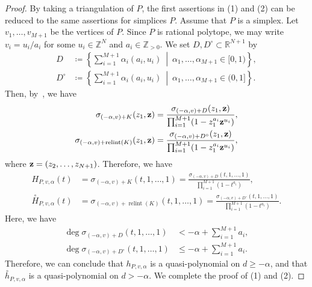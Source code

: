 \documentclass[ALCO,published]{cedram}
\theoremstyle{remark}
\begin{document}
\begin{proof}
By taking a triangulation of $P$, 
the first assertions in (1) and (2) can be reduced to the same assertions for simplices $P$. 
Assume that $P$ is a simplex. Let $v_1, \ldots, v_{M+1}$ be the vertices of $P$. 
Since $P$ is rational polytope, we may write $v_i = u_i / a_i$ for some $u_i \in \mathbb{Z}^N$ and $a_i \in \mathbb{Z}_{>0}$. 
We set $D, D^{\circ} \subset \mathbb{R}^{N+1}$ by
\begin{align*}
D &\coloneqq  \left\{ \sum _{i = 1}^{M+1}  \alpha _i (a_i, u_i) \ \middle | \ \alpha_1, \ldots, \alpha_{M+1} \in [0,1) \right\}, \\ 
D^{\circ} &\coloneqq  \left\{ \sum _{i = 1}^{M+1} \alpha _i (a_i, u_i) \ \middle | \ \alpha_1, \ldots, \alpha_{M+1} \in (0,1] \right\}.
\end{align*}
Then, by~\cite[Theorem 3.5]{BR}, we have 
\begin{align*}
\sigma _{(- \alpha, v) + K} (z_1, {\bf z}) 
&= \frac{\sigma _{(- \alpha, v) + D} (z_1, {\bf z})}{\prod _{i=1} ^{M+1} (1-z_1^{a_i} {\bf z}^{u_i})}, \\
\sigma _{(- \alpha, v) + \operatorname{relint}(K)} (z_1, {\bf z}) 
&= \frac{\sigma _{(- \alpha, v) + D^{\circ}} (z_1, {\bf z})}{\prod _{i=1} ^{M+1} (1-z_1^{a_i} {\bf z}^{u_i})}, 
\end{align*}
where ${\bf z} = (z_2, \ldots, z_{N+1})$. 
Therefore, we have 
\begin{align*}
H_{P,v,\alpha} (t) 
&= \sigma _{(- \alpha, v) + K} (t, 1, \ldots , 1) 
= \frac{\sigma _{(- \alpha, v) + D} (t, 1, \ldots, 1)}{\prod _{i=1} ^{M+1} (1- t^{a_i})}, \\
\overset{\circ}{H}_{P,v,\alpha} (t) 
&= \sigma _{(- \alpha, v) + \operatorname{relint}(K)} (t, 1, \ldots , 1) 
= \frac{\sigma _{(- \alpha, v) + D^{\circ}} (t, 1, \ldots, 1)}{\prod _{i=1} ^{M+1} (1- t^{a_i})}. 
\end{align*}
Here, we have 
\begin{align*}
\deg \sigma _{(- \alpha, v) + D} (t, 1, \ldots, 1) 
&< - \alpha + \sum _{i=1} ^{M+1} a_i, \\
\deg \sigma _{(- \alpha, v) + D^{\circ}} (t, 1, \ldots, 1) 
&\le - \alpha + \sum _{i=1} ^{M+1} a_i. 
\end{align*}
Therefore, we can conclude that $h_{P, v, \alpha}$ is a quasi-polynomial on $d \ge - \alpha$, and 
that $\overset{\circ}{h}_{P, v, \alpha}$ is a quasi-polynomial on $d > - \alpha$. 
We complete the proof of (1) and (2). 


\end{proof}
\end{document}
